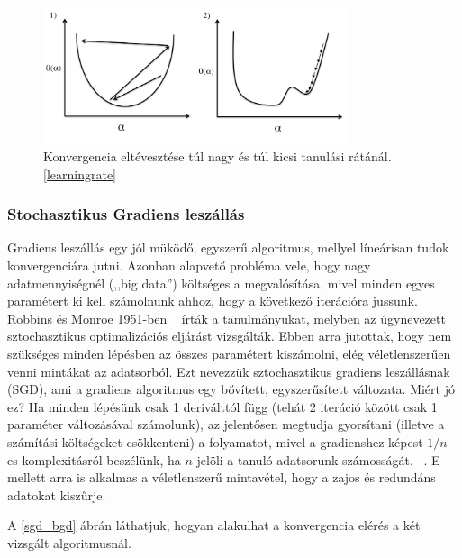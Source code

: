 \documentclass[a4paper,12pt]{article}
\begin{document}
\begin{figure}[ht!]
\centering
\includegraphics[width=90mm]{img/alfa.png}
\caption{Konvergencia eltévesztése túl nagy és túl kicsi tanulási rátánál. \ref{learningrate} \label{alfa}}
\end{figure}

\subsubsection{Stochasztikus Gradiens leszállás}

Gradiens leszállás egy jól müködő, egyszerű algoritmus, mellyel líneárisan tudok konvergenciára jutni. Azonban alapvető probléma vele, hogy nagy adatmennyiségnél (,,big data'') költséges a megvalósítása, mivel minden egyes paramétert ki kell számolnunk ahhoz, hogy a következő iterációra jussunk. Robbins és Monroe 1951-ben ~\cite{stoch1951} írták a tanulmányukat, melyben az úgynevezett sztochasztikus optimalizációs eljárást vizsgálták. Ebben arra jutottak, hogy nem szükséges minden lépésben az összes paramétert kiszámolni, elég véletlenszerűen venni mintákat az adatsorból. Ezt nevezzük sztochasztikus gradiens leszállásnak (SGD), ami a gradiens algoritmus egy bővített, egyszerűsített változata. \linebreak
Miért jó ez? Ha minden lépésünk csak 1 deriválttól függ (tehát 2 iteráció között csak 1 paraméter változásával számolunk), az jelentősen megtudja gyorsítani (illetve a számítási költségeket csökkenteni) a folyamatot, mivel a gradienshez képest $1/n$-es komplexitásról beszélünk, ha $n$ jelöli a tanuló adatsorunk számosságát. ~\cite{asgd}. E mellett arra is alkalmas a véletlenszerű mintavétel, hogy a zajos és redundáns adatokat kiszűrje. ~\cite{gatsby} \linebreak

A \ref{sgd_bgd} ábrán láthatjuk, hogyan alakulhat a konvergencia elérés a két vizsgált algoritmusnál. 
\end{document}
